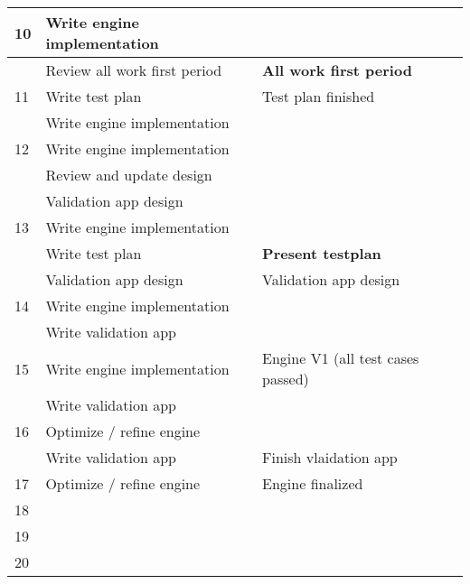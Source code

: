 \documentclass{article} %
\begin{document}
\begin{tabularx}{\textwidth}{|l|X|X|}
    10 & Write engine implementation &  \\ \hline
       & Review all work first period & \textbf{All work first period} \\ \hline
    11 & Write test plan & Test plan finished \\ \hline
       & Write engine implementation & \\ \hline
    12 & Write engine implementation &  \\ \hline
       & Review and update design & \\ \hline
       & Validation app design & \\ \hline
    13 & Write engine implementation & \\ \hline
       & Write test plan & \textbf{Present testplan} \\ \hline
       & Validation app design & Validation app design \\ \hline
    14 & Write engine implementation &  \\ \hline
       & Write validation app & \\ \hline
    15 & Write engine implementation & Engine V1 (all test cases passed) \\ \hline
       & Write validation app & \\ \hline
    16 & Optimize / refine engine &  \\ \hline
       & Write validation app & Finish vlaidation app \\ \hline
    17 & Optimize / refine engine & Engine finalized \\ \hline
    18 &  &  \\ \hline
    19 &  &  \\ \hline
    20 &  &  \\ \hline
    \end{tabularx}
    \newpage
\end{document}
